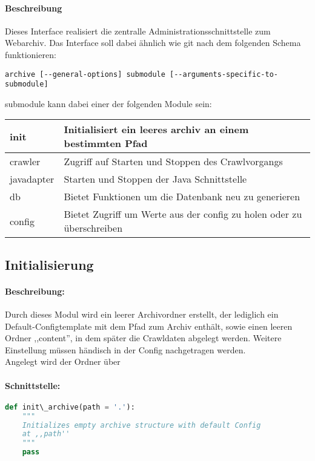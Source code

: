 \paragraph{Beschreibung}
\label{par:beschreibung}
Dieses Interface realisiert die zentralle Administrationsschnittstelle zum Webarchiv. 
Das Interface soll dabei ähnlich wie git nach dem folgenden Schema funktionieren:
\begin{verbatim}
archive [--general-options] submodule [--arguments-specific-to-submodule]
\end{verbatim}
submodule kann dabei einer der folgenden Module sein:
\begin{table}[h]

\centering
\begin{tabular}{|l|l|}
    \hline
init & Initialisiert ein leeres archiv an einem bestimmten Pfad \\
    \hline
crawler & Zugriff auf Starten und Stoppen des Crawlvorgangs \\
    \hline
javadapter & Starten und Stoppen der Java Schnittstelle \\
    \hline
db & Bietet Funktionen um die Datenbank neu zu generieren \\
    \hline
config & Bietet Zugriff um Werte aus der config zu holen oder zu überschreiben \\
    \hline
\end{tabular}
\end{table}

\subsection{Initialisierung} 
\label{sub:initialisierung}
\paragraph{Beschreibung:}
\label{par:beschreibung}
Durch dieses Modul wird ein leerer Archivordner erstellt, der lediglich
ein Default-Configtemplate mit dem Pfad zum Archiv enthält, sowie einen leeren Ordner ,,content'',
in dem später die Crawldaten abgelegt werden.
Weitere Einstellung müssen händisch in der Config nachgetragen werden.
\\
Angelegt wird der Ordner über %
\paragraph{Schnittstelle:}
\label{par:schnittstelle}
\begin{lstlisting}[language=python]
def init\_archive(path = '.'):
    """
    Initializes empty archive structure with default Config
    at ,,path''
    """
    pass
\end{lstlisting}


